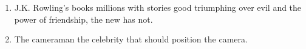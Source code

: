 \begin{enumerate}

\item \begin{inparaenum}[A]
J.K. Rowling’s books  millions with stories  good triumphing over evil and the power of friendship,  the new  has not. 
\end{inparaenum}

\item \begin{inparaenum}[A]
The cameraman   the celebrity that   should position    the camera. 
\end{inparaenum}

\end{enumerate} 
